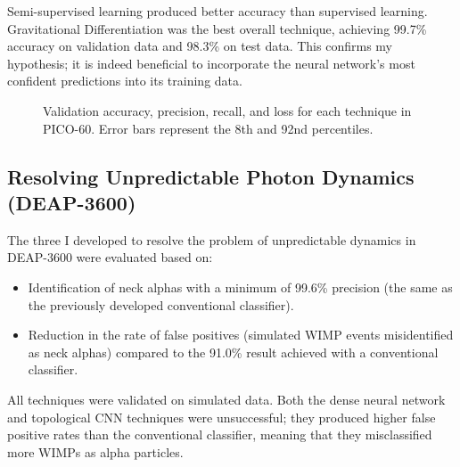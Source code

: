 \documentclass[12pt]{article}
\begin{document}
Semi-supervised learning produced better accuracy than supervised learning. Gravitational Differentiation was the best overall technique, achieving 99.7\% accuracy on validation data and 98.3\% on test data. This confirms my hypothesis; it is indeed beneficial to incorporate the neural network's most confident predictions into its training data.

\begin{figure}[ht]
    \centering
    \caption{\label{pico_final_results} Validation accuracy, precision, recall, and loss for each technique in PICO-60. Error bars represent the 8th and 92nd percentiles.}
\end{figure}

\subsection{Resolving Unpredictable Photon Dynamics (DEAP-3600)}

The three I developed to resolve the problem of unpredictable dynamics in DEAP-3600 were evaluated based on:

\begin{itemize}
    \item Identification of neck alphas with a minimum of 99.6\% precision (the same as the previously developed conventional classifier).
    \item Reduction in the rate of false positives (simulated WIMP events misidentified as neck alphas) compared to the 91.0\% result achieved with a conventional classifier.
\end{itemize}

All techniques were validated on simulated data. Both the dense neural network and topological CNN techniques were unsuccessful; they produced higher false positive rates than the conventional classifier, meaning that they misclassified more WIMPs as alpha particles.
\end{document}
